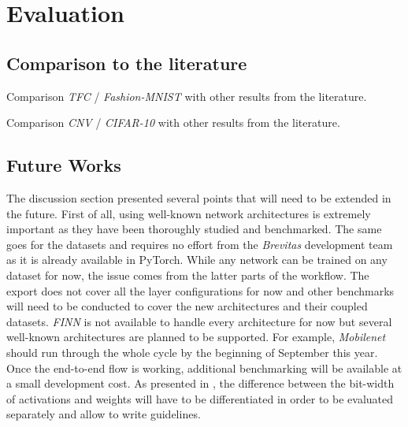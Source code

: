 
\section{Evaluation}


\subsection{Comparison to the literature}


Comparison \emph{TFC} / \emph{Fashion-MNIST} with other results from the literature.

Comparison \emph{CNV} / \emph{CIFAR-10} with other results from the literature.

\subsection{Future Works}

The discussion section presented several points that will need to be extended in the future. First of all, using well-known network architectures is extremely important as they have been thoroughly studied and benchmarked. The same goes for the datasets and requires no effort from the \emph{Brevitas} development team as it is already available in PyTorch. While any network can be trained on any dataset for now, the issue comes from the latter parts of the workflow. The export does not cover all the layer configurations for now and other benchmarks will need to be conducted to cover the new architectures and their coupled datasets. \emph{FINN} is not available to handle every architecture for now but several well-known architectures are planned to be supported. For example, \emph{Mobilenet} should run through the whole cycle by the beginning of September this year. Once the end-to-end flow is working, additional benchmarking will be available at a small development cost. As presented in \cite{Bacchus2020}, the difference between the bit-width of activations and weights will have to be differentiated in order to be evaluated separately and allow to write guidelines.

